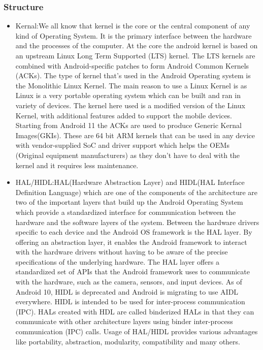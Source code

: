\documentclass[conference]{IEEEtran}
\begin{document}
\subsubsection{Structure}
\begin{itemize}
\item Kernal:\linebreak We all know that kernel is the core or the central component of any kind of Operating System. It is the primary interface between the hardware and the processes of the computer.  At the core the android kernel is based on an upstream Linux Long Term Supported (LTS) kernel. The LTS kernels are combined with Android-specific patches to form Android Common Kernels (ACKs). The type of kernel that’s used in the Android Operating system is the Monolithic Linux Kernel. The main reason to use a Linux Kernel is as Linux is a very portable operating system which can be built and ran in variety of devices. The kernel here used is a modified version of the Linux Kernel, with additional features added to support the mobile devices. Starting from Android 11 the ACKs are used to produce Generic Kernal Images(GKIs). These are 64 bit ARM kernels that can be used in any device with vendor-supplied SoC and driver support which helps the OEMs (Original equipment manufacturers) as they don’t have to deal with the kernel and it requires less maintenance.
\linebreak
\item HAL/HIDL:\linebreak HAL(Hardware Abstraction Layer) and HIDL(HAL Interface Definition Language) which are one of the components of the architecture are two of the important layers that build up the Android Operating System which provide a standardized interface for communication between the hardware and the software layers of the system. Between the hardware drivers specific to each device and the Android OS framework is the HAL layer. By offering an abstraction layer, it enables the Android framework to interact with the hardware drivers without having to be aware of the precise specifications of the underlying hardware. The HAL layer offers a standardized set of APIs that the Android framework uses to communicate with the hardware, such as the camera, sensors, and input devices. As of Android 10, HIDL is deprecated and Android is migrating to use AIDL everywhere. HIDL is intended to be used for inter-process communication (IPC). HALs created with HDL are called binderized HALs in that they can communicate with other architecture layers using binder inter-process communication (IPC) calls. Usage of HAL/HIDL provides various advantages like portability, abstraction, modularity, compatibility and many others.

\end{itemize}
\end{document}
